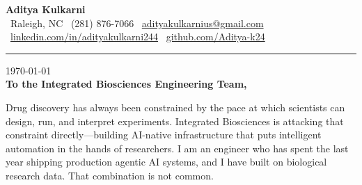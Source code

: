 \documentclass[11pt,letterpaper]{article}
\begin{document}
\begin{center}
    {\Huge \textbf{\color{IBSTeal} Aditya Kulkarni}}\\[8pt]
    {\color{DarkGrey} \small
    \faMapMarker* \ Raleigh, NC \quad \textbar \quad
    \faPhone \ (281) 876-7066 \quad \textbar \quad
    \faEnvelope \ \href{mailto:adityakulkarnius@gmail.com}{adityakulkarnius@gmail.com} \\[4pt]
    \faLinkedin \ \href{https://linkedin.com/in/adityakulkarni244}{linkedin.com/in/adityakulkarni244} \quad \textbar \quad
    \faGithub \ \href{https://github.com/Aditya-k24}{github.com/Aditya-k24}
    }
\end{center}

\vspace{-4pt}
{\color{IBSTeal}\rule{\linewidth}{1.5pt}}
\vspace{10pt}

\today\\[10pt]
\textbf{To the Integrated Biosciences Engineering Team,}

\vspace{6pt}

Drug discovery has always been constrained by the pace at which scientists can design, run, and interpret experiments. Integrated Biosciences is attacking that constraint directly---building AI-native infrastructure that puts intelligent automation in the hands of researchers. I am an engineer who has spent the last year shipping production agentic AI systems, and I have built on biological research data. That combination is not common.

\vspace{4pt}
\end{document}
